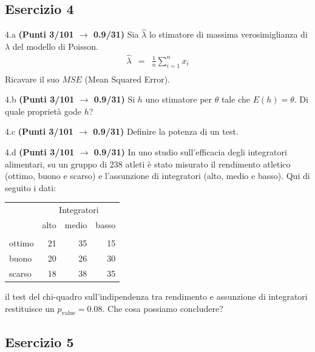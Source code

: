 \documentclass[
  11pt,
]{book}
\theoremstyle{mytheoremstyle}
\theoremstyle{mydefstyle}
\begin{document}
\subsection{Esercizio 4}\label{esercizio-4-18}

4.a \textbf{(Punti 3/101 \(\rightarrow\) 0.9/31)} Sia \(\hat \lambda\) lo stimatore di massima verosimiglianza di \(\lambda\) del modello di Poisson.
\begin{eqnarray*}
  \hat\lambda &=&  \frac 1n\sum_{i=1}^nx_i\\
\end{eqnarray*}
Ricavare il suo \(MSE\) (Mean Squared Error).

4.b \textbf{(Punti 3/101 \(\rightarrow\) 0.9/31)} Si \(h\) uno stimatore per \(\theta\) tale che \(E(h)=\theta\). Di quale proprietà gode \(h\)?

4.c \textbf{(Punti 3/101 \(\rightarrow\) 0.9/31)} Definire la potenza di un test.

4.d \textbf{(Punti 3/101 \(\rightarrow\) 0.9/31)} In uno studio sull'efficacia degli integratori alimentari, su un gruppo di 238 atleti è stato misurato il rendimento atletico (ottimo, buono e scarso) e l'assunzione di integratori (alto, medio e basso). Qui di seguito i dati:

\begin{table}[H]
\centering\centering
\begin{tabular}{lrrr}
\toprule
\multicolumn{1}{c}{ } & \multicolumn{3}{c}{Integratori} \\
\cmidrule(l{3pt}r{3pt}){2-4}
  & alto & medio & basso\\
\midrule
\addlinespace[0.3em]
\multicolumn{4}{l}{\textbf{rendimento}}\\
\hspace{1em}ottimo & 21 & 35 & 15\\
\hspace{1em}buono & 20 & 26 & 30\\
\hspace{1em}scarso & 18 & 38 & 35\\
\bottomrule
\end{tabular}
\end{table}

il test del chi-quadro sull'indipendenza tra rendimento e assunzione di integratori restituisce un \(p_\text{value}=0.08\). Che cosa possiamo concludere?

\subsection{Esercizio 5}\label{esercizio-5-17}
\end{document}
